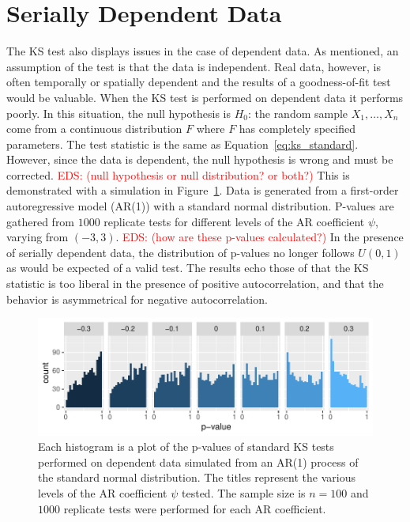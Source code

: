 \documentclass[12pt, letterpaper, titlepage]{article}
\newcommand{\eds}[1]{\textcolor{red}{EDS: (#1)}}
\begin{document}
\section{Serially Dependent Data}
\label{sec:dependence}

The KS test also displays issues in the case of dependent data. As mentioned, an
assumption of the test is that the data is independent. Real data, however,
is often temporally or spatially dependent and the results of a goodness-of-fit
test would be valuable. When the KS test is performed on dependent data it
performs poorly. In this situation, the null hypothesis is $H_0$: the random
sample $X_1, \ldots, X_n$ come from a continuous distribution $F$ where $F$ has
completely specified parameters. The test statistic is the same as
Equation~\eqref{eq:ks_standard}. However, since the data is dependent, the null
hypothesis is wrong and must be corrected.
\eds{null hypothesis or null distribution? or both?}
This is demonstrated with a
simulation in Figure~\ref{fig:hist_correlation}. Data is generated from a
first-order autoregressive model (AR(1)) with a standard normal distribution.
P-values are gathered from $1000$ replicate tests for different levels of the
AR coefficient $\psi$, varying from $(-3,3)$.
\eds{how are these p-values calculated?}
In the presence of serially
dependent data, the distribution of p-values no longer follows $U(0, 1)$ as
would be expected of a valid test. The results echo those of \citet{Durilleul}
that the KS statistic is too liberal in the presence of positive
autocorrelation, and that the behavior is asymmetrical for negative
 autocorrelation.

\begin{figure}[tbp]
  \centering
  \includegraphics[width=\textwidth]{hist_correlation}
  \caption{Each histogram is a plot of the p-values of standard KS tests
  performed on dependent data simulated from an AR(1) process of the standard
  normal distribution. The titles represent the various levels of the AR
  coefficient $\psi$ tested. The sample size is $n = 100$ and $1000$ replicate
  tests were performed for each AR coefficient.}
  \label{fig:hist_correlation}
\end{figure}
\end{document}
